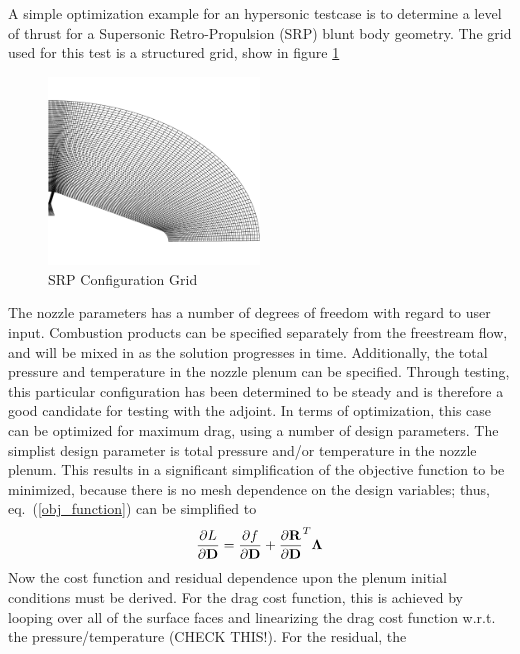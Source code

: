 \documentclass{article}   	%
\begin{document}
A simple optimization example for an hypersonic testcase is to determine a level
of thrust for a Supersonic Retro-Propulsion (SRP) blunt body geometry.  The grid
used for this test is a structured grid, show in figure \ref{fig:srp_grid}
\begin{figure}[h]
  \centering
  \includegraphics[width=0.5\textwidth]{srp_grid}
  \caption{SRP Configuration Grid}
  \label{fig:srp_grid}
\end{figure}
The nozzle parameters has a number of degrees of freedom with regard to user
input.  Combustion products can be specified separately from the freestream
flow, and will be mixed in as the solution progresses in time. Additionally, the
total pressure and temperature in the nozzle plenum can be specified.  Through
testing, this particular configuration has been determined to be steady and is
therefore a good candidate for testing with the adjoint.  In terms of
optimization, this case can be optimized for maximum drag, using a number of
design parameters.  The simplist design parameter is total pressure and/or
temperature in the nozzle plenum.  This results in a significant simplification
of the objective function to be minimized, because there is no mesh dependence
on the design variables; thus, eq.~(\ref{obj_function}) can be simplified to
\begin{equation}
  \frac{\partial L}{\partial \mathbf D}=
  \frac{\partial f}{\partial \mathbf D}
  +\frac{\partial \mathbf R}{\partial \mathbf D}^T\mathbf{\Lambda}
  \label{simp_obj_func}
\end{equation}
Now the cost function and residual dependence upon the plenum initial conditions
must be derived.  For the drag cost function, this is achieved by looping over
all of the surface faces and linearizing the drag cost function w.r.t. the
pressure/temperature (CHECK THIS!).  For the residual, the 
\end{document}
